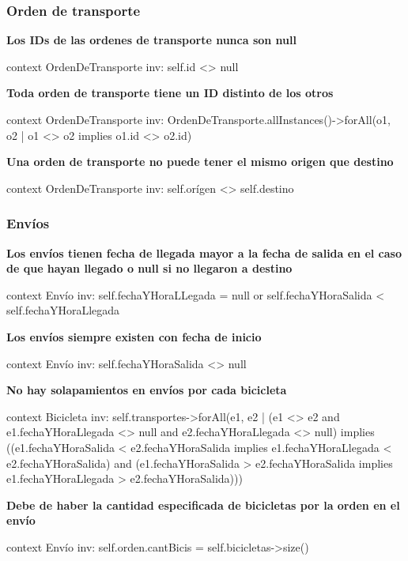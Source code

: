 \documentclass[a4paper, 10pt, twoside]{article}
\newenvironment{ocl}[1]
  {
    \textbf{#1}
    \verbatim
  }{
    \endverbatim
  }
\begin{document}
\subsubsection{Orden de transporte}

\begin{ocl}{Los IDs de las ordenes de transporte nunca son null}
  context OrdenDeTransporte
  inv: self.id <> null
\end{ocl}

\begin{ocl}{Toda orden de transporte tiene un ID distinto de los otros}
  context OrdenDeTransporte
  inv: OrdenDeTransporte.allInstances()->forAll(o1, o2 |
           o1 <> o2 implies o1.id <> o2.id)
\end{ocl}

\begin{ocl}{Una orden de transporte no puede tener el mismo origen que destino}
  context OrdenDeTransporte
  inv: self.orígen <> self.destino
\end{ocl}


\subsubsection{Envíos}

\begin{ocl}{Los envíos tienen fecha de llegada mayor a la fecha de salida en el caso de que hayan llegado o null si no llegaron a destino}
  context Envío
  inv: self.fechaYHoraLLegada = null or self.fechaYHoraSalida < self.fechaYHoraLlegada
\end{ocl}

\begin{ocl}{Los envíos siempre existen con fecha de inicio}
  context Envío
  inv: self.fechaYHoraSalida <> null
\end{ocl}

\begin{ocl}{No hay solapamientos en envíos por cada bicicleta}
  context Bicicleta
  inv: self.transportes->forAll(e1, e2 |
           (e1 <> e2 and e1.fechaYHoraLlegada <> null and e2.fechaYHoraLlegada <> null) implies
               ((e1.fechaYHoraSalida  < e2.fechaYHoraSalida implies
                 e1.fechaYHoraLlegada < e2.fechaYHoraSalida) and
                (e1.fechaYHoraSalida  > e2.fechaYHoraSalida implies
                 e1.fechaYHoraLlegada > e2.fechaYHoraSalida)))
\end{ocl}

\begin{ocl}{Debe de haber la cantidad especificada de bicicletas por la orden en el envío}
  context Envío
  inv: self.orden.cantBicis = self.bicicletas->size()
\end{ocl}
\end{document}
